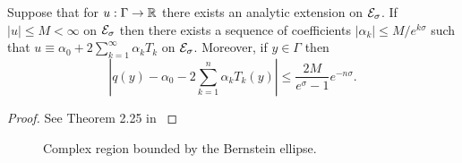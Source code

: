 \documentclass[11pt,final]{amsart}       %
\begin{document}
\begin{theorem}
Suppose that for $u:\Gamma \rightarrow \Bbb{R}$ there exists an analytic
extension on ${\mathcal E}_{\sigma}$. If $|u| \leq M < \infty$ on
${\mathcal E}_{\sigma}$ then there exists a sequence of coefficients
$|\alpha_k| \leq M / e^{k\sigma}$ such that $u \equiv \alpha_0 +
2\sum_{k = 1}^{\infty} \alpha_{k} T_{k}$ on ${\mathcal E}_{\sigma}$. Moreover,
if $y \in \Gamma$ then
\[
|q(y) - \alpha_0  - 2\sum_{k = 1}^{n} \alpha_{k} T_{k}(y)|
\leq 
\frac{2M}{e^{\sigma} - 1} e^{-n \sigma}.
\]
\label{errorestimates:theorem}
\end{theorem}
\begin{proof}
See Theorem 2.25 in \cite{Khoromskij2018}
\end{proof}


\begin{figure}[htb]%
\begin{center}
\end{center}
\caption{Complex region bounded by the Bernstein ellipse.}
\label{erroranalysis:sparsegrid:polyellipse}
\end{figure}
\end{document}

